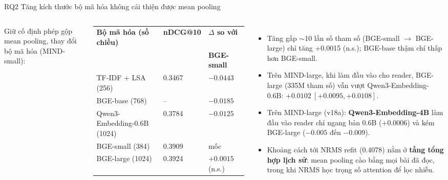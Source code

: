 \documentclass[aspectratio=169,t]{beamer}
\begin{document}
\begin{frame}[shrink]{RQ2 \textperiodcentered{} Tăng kích thước bộ mã hóa không cải thiện được mean pooling}
\begin{columns}[T,onlytextwidth]
\scriptsize
Giữ cố định phép gộp mean pooling, thay đổi bộ mã hóa (MIND-small):\par\vspace{2pt}
\renewcommand{\arraystretch}{1.18}
\setlength{\tabcolsep}{4pt}
\begin{tabularx}{\linewidth}{@{}YQ{1.35cm}R{1.85cm}@{}}
\toprule
\textbf{Bộ mã hóa (số chiều)} & \textbf{nDCG@10} & \textbf{$\Delta$ so với}\\
 & & \textbf{BGE-small}\\
\midrule
TF-IDF + LSA (256) & 0.3467 & $-0.0443$\\
BGE-base (768) & -- & $-0.0185$\\
Qwen3-Embedding-0.6B (1024) & 0.3784 & $-0.0125$\\
BGE-small (384) & 0.3909 & mốc\\
BGE-large (1024) & 0.3924 & $+0.0015$ (n.s.)\\
\bottomrule
\end{tabularx}
\footnotesize
\begin{itemize}
  \setlength{\itemsep}{3pt}
  \item Tăng gấp $\sim$10 lần số tham số (BGE-small $\to$ BGE-large) chỉ tăng +0.0015 (n.s.); BGE-base thậm chí thấp hơn BGE-small.
  \item Trên MIND-large, khi làm đầu vào cho reader, BGE-large (335M tham số) vẫn vượt Qwen3-Embedding-0.6B: $+0.0102\ [+0.0095, +0.0108]$.
  \item Trên MIND-large (v18a): \textbf{Qwen3-Embedding-4B} làm đầu vào reader chỉ ngang bản 0.6B ($+0.0006$) và kém BGE-large ($-0.005$ đến $-0.009$).
  \item Khoảng cách tới NRMS refit (0.4078) nằm ở \textbf{tầng tổng hợp lịch sử}: mean pooling cào bằng mọi bài đã đọc, trong khi NRMS học trọng số attention để lọc nhiễu.
\end{itemize}
\end{columns}
\par\kern0pt%
\end{frame}
\end{document}

